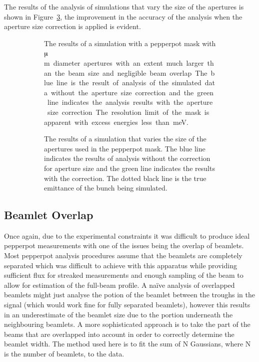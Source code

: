The results of the analysis of simulations that vary the size of the apertures is shown in Figure~\ref{figure:aperture_size_sim}, the improvement in the accuracy of the analysis when the aperture size correction is applied is evident.

\begin{figure}
\begin{subfigure}[b]{\textwidth}
    \center
    
    \caption{The results of a simulation with a pepperpot mask with \unit[50]{$\muup$m} diameter apertures with an extent much larger than the beam size and negligible beam overlap. The blue line is the result of analysis of the simulated data without the aperture size correction and the green line indicates the analysis results with the aperture size correction. The resolution limit of the mask is apparent with excess energies less than \unit[10]{meV}.}
    \label{figure:wavelength_sim}
\end{subfigure}

\begin{subfigure}[b]{\textwidth}
    \center
    
    \caption{The results of a simulation that varies the size of the apertures used in the pepperpot mask. The blue line indicates the results of analysis without the correction for aperture size and the green line indicates the results with the correction. The dotted black line is the true emittance of the bunch being simulated.}
    \label{figure:aperture_size_sim}
\end{subfigure}
    \caption{}
\end{figure}

\subsection{Beamlet Overlap}
Once again, due to the experimental constraints it was difficult to produce ideal pepperpot measurements with one of the issues being the overlap of beamlets.
Most pepperpot analysis procedures assume that the beamlets are completely separated which was difficult to achieve with this apparatus while providing sufficient flux for streaked measurements and enough sampling of the beam to allow for estimation of the full-beam profile.
A na\"ive analysis of overlapped beamlets might just analyse the potion of the beamlet between the troughs in the signal (which would work fine for fully separated beamlets), however this results in an underestimate of the beamlet size due to the portion underneath the neighbouring beamlets.
A more sophisticated approach is to take the part of the beams that are overlapped into account in order to correctly determine the beamlet width.
The method used here is to fit the sum of N Gaussians, where N is the number of beamlets, to the data.

